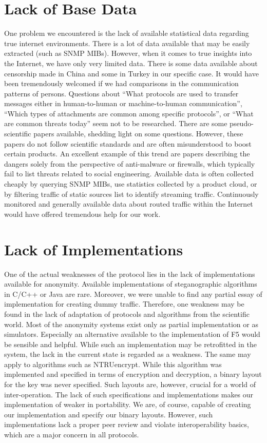 \section{Lack of Base Data}

One problem we encountered is the lack of available statistical data regarding true internet environments. There is a lot of data available that may be easily extracted (such as SNMP MIBs). However, when it comes to true insights into the Internet, we have only very limited data. There is some data available about censorship made in China and some in Turkey in our specific case. It would have been tremendously welcomed if we had comparisons in the communication patterns of persons. Questions about ``What protocols are used to transfer messages either in human-to-human or machine-to-human communication'', ``Which types of attachments are common among specific protocols'', or ``What are common threats today'' seem not to be researched. There are some pseudo-scientific papers available, shedding light on some questions. However, these papers do not follow scientific standards and are often misunderstood to boost certain products. An excellent example of this trend are papers describing the dangers solely from the perspective of anti-malware or firewalls, which typically fail to list threats related to social engineering. Available data is often collected cheaply by querying SNMP MIBs, use statistics collected by a product cloud, or by filtering traffic of static sources list to identify streaming traffic. Continuously monitored and generally available data about routed traffic within the Internet would have offered tremendous help for our work.

\section{Lack of Implementations}
One of the actual weaknesses of the protocol lies in the lack of implementations available for anonymity. Available implementations of steganographic algorithms in C/C++ or Java are rare. Moreover, we were unable to find any partial essay of implementation for creating dummy traffic. Therefore, one weakness may be found in the lack of adaptation of protocols and algorithms from the scientific world. Most of the anonymity systems exist only as partial implementation or as simulators. Especially an alternative available to the implementation of F5 would be sensible and helpful. While such an implementation may be retrofitted in the system, the lack in the current state is regarded as a weakness. The same may apply to algorithms such as NTRUencrypt. While this algorithm was implemented and specified in terms of encryption and decryption, a binary layout for the key was never specified. Such layouts are, however, crucial for a world of inter-operation. The lack of such specifications and implementations makes our implementation of \MessageVortex{} weaker in portability. We are, of course, capable of creating our implementation and specify our binary layouts. However, such implementations lack a proper peer review and violate interoperability basics, which are a major concern in all protocols. 

